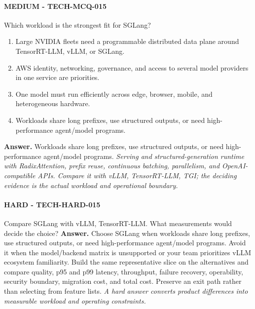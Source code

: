 \paragraph{MEDIUM - TECH-MCQ-015} Which workload is the strongest fit for SGLang?
\begin{enumerate}[label=\Alph*.]
\item Large NVIDIA fleets need a programmable distributed data plane around TensorRT-LLM, vLLM, or SGLang.
\item AWS identity, networking, governance, and access to several model providers in one service are priorities.
\item One model must run efficiently across edge, browser, mobile, and heterogeneous hardware.
\item Workloads share long prefixes, use structured outputs, or need high-performance agent/model programs.
\end{enumerate}
\textbf{Answer.} Workloads share long prefixes, use structured outputs, or need high-performance agent/model programs.
\textit{Serving and structured-generation runtime with RadixAttention, prefix reuse, continuous batching, parallelism, and OpenAI-compatible APIs. Compare it with vLLM, TensorRT-LLM, TGI; the deciding evidence is the actual workload and operational boundary.}
\paragraph{HARD - TECH-HARD-015} Compare SGLang with vLLM, TensorRT-LLM. What measurements would decide the choice?
\textbf{Answer.} Choose SGLang when workloads share long prefixes, use structured outputs, or need high-performance agent/model programs. Avoid it when the model/backend matrix is unsupported or your team prioritizes vLLM ecosystem familiarity. Build the same representative slice on the alternatives and compare quality, p95 and p99 latency, throughput, failure recovery, operability, security boundary, migration cost, and total cost. Preserve an exit path rather than selecting from feature lists.
\textit{A hard answer converts product differences into measurable workload and operating constraints.}
